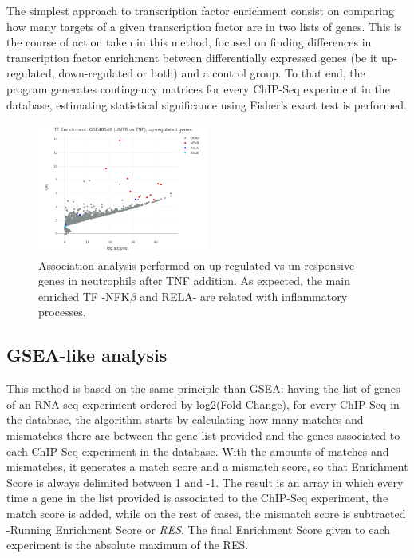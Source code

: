\documentclass[a4paper, 12pt ]{article}
\begin{document}
The simplest approach to transcription factor enrichment consist on comparing how many targets of a given transcription factor are in two lists of genes. This is the course of action taken in this method, focused on finding differences in transcription factor enrichment between differentially expressed genes (be it up-regulated, down-regulated or both) and a control group. To that end, the program generates contingency matrices for every ChIP-Seq experiment in the database, estimating statistical significance using Fisher's exact test is performed.

\begin{figure}
	\centering
	\includegraphics[width=0.50\textwidth]{graf-tfea1}
	\caption{Association analysis performed on up-regulated vs un-responsive genes in neutrophils after TNF addition. As expected, the main enriched TF -NFK$\beta$ and RELA- are related with inflammatory processes.}
\end{figure}

\subsection{GSEA-like analysis}

This method is based on the same principle than GSEA\cite{GSEA1}\cite{GSEA2}: having the list of genes of an RNA-seq experiment ordered by log2(Fold Change), for every ChIP-Seq in the database, the algorithm starts by calculating how many matches and mismatches there are between the gene list provided and the genes associated to each ChIP-Seq experiment in the database. With the amounts of matches and mismatches, it generates a match score and a mismatch score, so that Enrichment Score is always delimited between 1 and -1. The result is an array in which every time a gene in the list provided is associated to the ChIP-Seq experiment, the match score is added, while on the rest of cases, the mismatch score is subtracted -Running Enrichment Score or \textit{RES}. The final Enrichment Score given to each experiment is the absolute maximum of the RES.
\end{document}
